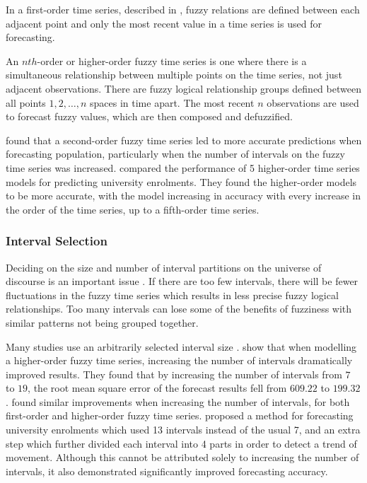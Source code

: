 \documentclass[12pt, oneside, a4paper]{article}
\theoremstyle{definition}
\begin{document}
\label{higher}

In a first-order time series, described in , fuzzy relations are defined between each adjacent point and only the most recent value in a time series is used for forecasting.

An $nth$-order or higher-order fuzzy time series is one where there is a simultaneous relationship between multiple points on the time series, not just adjacent observations. There are fuzzy logical relationship groups defined between all points $1,2,\ldots,n$ spaces in time apart. The most recent $n$ observations are used to forecast fuzzy values, which are then composed and defuzzified.

\cite{tsai1999study} found that a second-order fuzzy time series led to more accurate predictions when forecasting population, particularly when the number of intervals on the fuzzy time series was increased. \cite{tsai2000forecasting} compared the performance of 5 higher-order time series models for predicting university enrolments. They found the higher-order models to be more accurate, with the model increasing in accuracy with every increase in the order of the time series, up to a fifth-order time series.

\subsubsection{Interval Selection}

\label{interval}

Deciding on the size and number of interval partitions on the universe of discourse is an important issue \citep{Huarng2001effective,  huarng2006ratio}. If there are too few intervals, there will be fewer fluctuations in the fuzzy time series \citep{Huarng2001effective} which results in less precise fuzzy logical relationships. Too many intervals can lose some of the benefits of fuzziness with similar patterns not being grouped together.

Many studies use an arbitrarily selected interval size \citep{song1993forecasting, song1994forecasting, chen1996forecasting, tsai2000forecasting, chen2004new}. \cite{tsai2000forecasting} show that when modelling a higher-order fuzzy time series, increasing the number of intervals dramatically improved results. They found that by increasing the number of intervals from $7$ to $19$, the root mean square error of the forecast results fell from $609.22$ to $199.32$. \cite{tsai1999study} found similar improvements when increasing the number of intervals, for both first-order and higher-order fuzzy time series. \cite{chen2004new} proposed a method for forecasting university enrolments which used 13 intervals instead of the usual 7, and an extra step which further divided each interval into 4 parts in order to detect a trend of movement. Although this cannot be attributed solely to increasing the number of intervals, it also demonstrated significantly improved forecasting accuracy. 	
\end{document}
